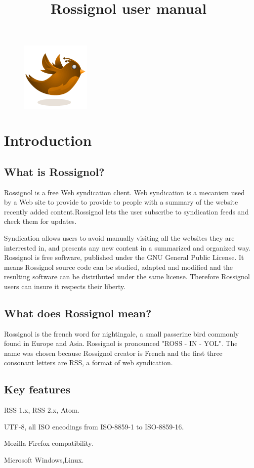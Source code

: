 \documentclass[11pt]{article} %
\title{Rossignol user manual}
\begin{document}
\maketitle
\begin{figure}[h!]
\centering
\includegraphics{img/rossignol.png}
\end{figure}
\newpage
\section{Introduction}
\subsection{What is Rossignol?}

Rossignol is a free Web syndication client. Web syndication 
is a mecanism used by a Web site to provide to provide to people with a 
summary of the website recently added content.Rossignol lets the user subscribe 
to syndication feeds and check them for updates. 

Syndication allows users to avoid manually visiting all the websites they are 
interrested in, and presents any new content in a summarized and organized way. 
Rossignol is free software, published under the GNU General Public License. It 
means Rossignol source code can be studied, adapted and modified and the 
resulting software can be distributed under the same license. Therefore 
Rossignol users can insure it respects their liberty. 

\subsection{What does Rossignol mean?}

Rossignol is the french word for nightingale, a small passerine bird commonly 
found in Europe and Asia. Rossignol is pronounced "ROSS - IN - YOL". The name 
was chosen because Rossignol creator is French and the first three consonant
letters are RSS, a format of web syndication. 

\subsection{Key features}
\begin{description}
\item [Feed formats] RSS 1.x, RSS 2.x, Atom.
\item [Supported encoding] UTF-8, all ISO encodings from ISO-8859-1 to
ISO-8859-16.
\item Mozilla Firefox compatibility. 
\item [Supported Operating System] Microsoft Windows,Linux. 

\end{description}
\end{document}
